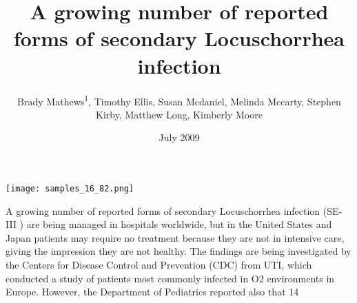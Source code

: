 \documentclass{article}
\title{A growing number of reported forms of secondary Locuschorrhea infection}
\author{Brady Mathews\textsuperscript{1},  Timothy Ellis,  Susan Mcdaniel,  Melinda Mccarty,  Stephen Kirby,  Matthew Long,  Kimberly Moore}
\affil{\textsuperscript{1}National Institute of Technology Rourkela}
\date{July 2009}
\begin{document}
\maketitle

\begin{center}
\begin{minipage}{0.75\linewidth}
\texttt{[image: samples\_16\_82.png]}
\end{minipage}
\end{center}

A growing number of reported forms of secondary Locuschorrhea infection (SE-III ) are being managed in hospitals worldwide, but in the United States and Japan patients may require no treatment because they are not in intensive care, giving the impression they are not healthy. The findings are being investigated by the Centers for Disease Control and Prevention (CDC) from UTI, which conducted a study of patients most commonly infected in O2 environments in Europe. However, the Department of Pediatrics reported also that 14%
\end{document}
